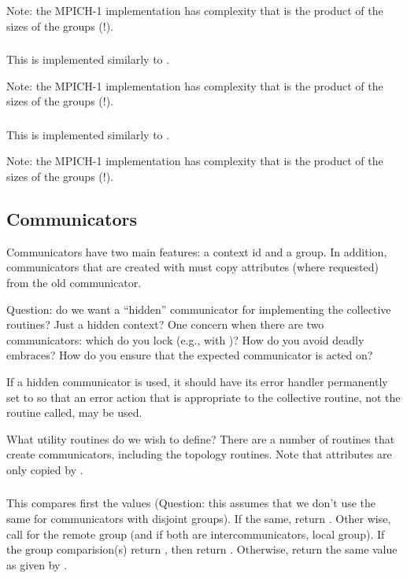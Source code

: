 \documentclass{article}
\begin{document}
Note: the MPICH-1 implementation has complexity that is the product of the
sizes of the groups (!).

\subsubsection{}

This is implemented similarly to .

Note: the MPICH-1 implementation has complexity that is the product of the
sizes of the groups (!).

\subsubsection{}

This is implemented similarly to .

Note: the MPICH-1 implementation has complexity that is the product of the
sizes of the groups (!).

\subsection{Communicators}

Communicators have two main features: a context id and a group.  In
addition, communicators that are created with  must
copy attributes (where requested) from the old communicator.

Question: do we want a ``hidden'' communicator for implementing the
collective routines?  Just a hidden context?  One concern when there
are two communicators: which do you lock (e.g., with
)?  How do you avoid deadly embraces?  How do
you 
ensure that the expected communicator is acted on?

If a hidden communicator is used, it should have its error handler permanently
set to  so that an error action that is
appropriate to 
the collective routine, not the routine called, may be used.

What utility routines do we wish to define?  There are a number of
routines that create communicators, including the topology routines.
Note that attributes are only copied by .

\subsubsection{}
This compares first the  values (Question: this assumes that
we don't use the same  for communicators with disjoint
groups).  If the same, return .  Other wise, call
 for the remote group (and if both are
intercommunicators, local group).  If the group comparision(s) return
, then return .  Otherwise, return
the same value as given by .
\end{document}
